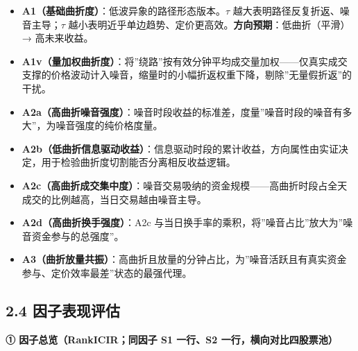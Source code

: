 \documentclass[UTF8,a4paper,zihao=-4,fontset=windows]{ctexart}
\providecommand{\tightlist}{\setlength{\itemsep}{0pt}\setlength{\parskip}{0pt}}
\begin{document}
\begin{itemize}
\tightlist
\item
  \textbf{A1（基础曲折度）}：低波异象的路径形态版本。\(\tau\)
  越大表明路径反复折返、噪音主导；\(\tau\)
  越小表明近乎单边趋势、定价更高效。\textbf{方向预期}：低曲折（平滑）→
  高未来收益。
\item
  \textbf{A1v（量加权曲折度）}：将''绕路''按有效分钟平均成交量加权------仅真实成交支撑的价格波动计入噪音，缩量时的小幅折返权重下降，剔除''无量假折返''的干扰。
\item
  \textbf{A2a（高曲折噪音强度）}：噪音时段收益的标准差，度量''噪音时段的噪音有多大''，为噪音强度的纯价格度量。
\item
  \textbf{A2b（低曲折信息驱动收益）}：信息驱动时段的累计收益，方向属性由实证决定，用于检验曲折度切割能否分离相反收益逻辑。
\item
  \textbf{A2c（高曲折成交集中度）}：噪音交易吸纳的资金规模------高曲折时段占全天成交的比例越高，当日交易越由噪音主导。
\item
  \textbf{A2d（高曲折换手强度）}：A2c
  与当日换手率的乘积，将''噪音占比''放大为''噪音资金参与的总强度''。
\item
  \textbf{A3（曲折放量共振）}：高曲折且放量的分钟占比，为''噪音活跃且有真实资金参与、定价效率最差''状态的最强代理。
\end{itemize}

\subsection{2.4
因子表现评估}\label{ux56e0ux5b50ux8868ux73b0ux8bc4ux4f30}

\textbf{① 因子总览（RankICIR；同因子 S1 一行、S2
一行，横向对比四股票池）}
\end{document}
